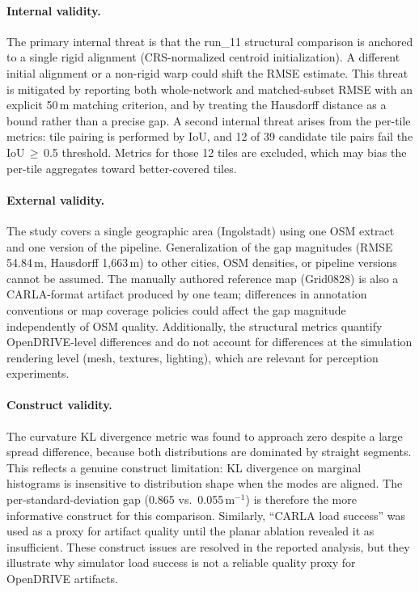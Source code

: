 \paragraph{Internal validity.}
The primary internal threat is that the run\_11 structural comparison is anchored to a single rigid alignment (CRS-normalized centroid initialization). A different initial alignment or a non-rigid warp could shift the RMSE estimate. This threat is mitigated by reporting both whole-network and matched-subset RMSE with an explicit 50\,m matching criterion, and by treating the Hausdorff distance as a bound rather than a precise gap. A second internal threat arises from the per-tile metrics: tile pairing is performed by IoU, and 12 of 39 candidate tile pairs fail the IoU\,$\geq$\,0.5 threshold. Metrics for those 12 tiles are excluded, which may bias the per-tile aggregates toward better-covered tiles.

\paragraph{External validity.}
The study covers a single geographic area (Ingolstadt) using one OSM extract and one version of the pipeline. Generalization of the gap magnitudes (RMSE 54.84\,m, Hausdorff 1{,}663\,m) to other cities, OSM densities, or pipeline versions cannot be assumed. The manually authored reference map (Grid0828) is also a CARLA-format artifact produced by one team; differences in annotation conventions or map coverage policies could affect the gap magnitude independently of OSM quality. Additionally, the structural metrics quantify OpenDRIVE-level differences and do not account for differences at the simulation rendering level (mesh, textures, lighting), which are relevant for perception experiments.

\paragraph{Construct validity.}
The curvature KL divergence metric was found to approach zero despite a large spread difference, because both distributions are dominated by straight segments. This reflects a genuine construct limitation: KL divergence on marginal histograms is insensitive to distribution shape when the modes are aligned. The per-standard-deviation gap (0.865 vs.\ 0.055\,m$^{-1}$) is therefore the more informative construct for this comparison. Similarly, ``CARLA load success'' was used as a proxy for artifact quality until the planar ablation revealed it as insufficient. These construct issues are resolved in the reported analysis, but they illustrate why simulator load success is not a reliable quality proxy for OpenDRIVE artifacts.

